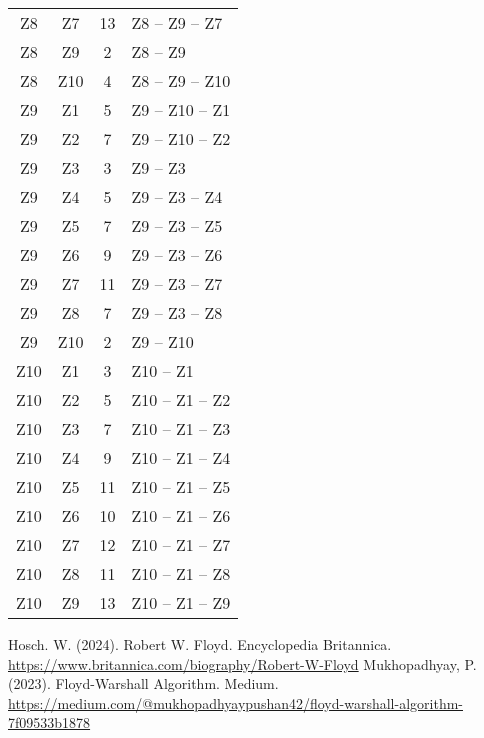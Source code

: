 \documentclass[a4paper,11pt]{article}
\begin{document}
\begin{longtable}{c c c p{7cm}}
Z8 & Z7 & 13 & Z8 -- Z9 -- Z7 \\
Z8 & Z9 & 2 & Z8 -- Z9 \\
Z8 & Z10 & 4 & Z8 -- Z9 -- Z10 \\
Z9 & Z1 & 5 & Z9 -- Z10 -- Z1 \\
Z9 & Z2 & 7 & Z9 -- Z10 -- Z2 \\
Z9 & Z3 & 3 & Z9 -- Z3 \\
Z9 & Z4 & 5 & Z9 -- Z3 -- Z4 \\
Z9 & Z5 & 7 & Z9 -- Z3 -- Z5 \\
Z9 & Z6 & 9 & Z9 -- Z3 -- Z6 \\
Z9 & Z7 & 11 & Z9 -- Z3 -- Z7 \\
Z9 & Z8 & 7 & Z9 -- Z3 -- Z8 \\
Z9 & Z10 & 2 & Z9 -- Z10 \\
Z10 & Z1 & 3 & Z10 -- Z1 \\
Z10 & Z2 & 5 & Z10 -- Z1 -- Z2 \\
Z10 & Z3 & 7 & Z10 -- Z1 -- Z3 \\
Z10 & Z4 & 9 & Z10 -- Z1 -- Z4 \\
Z10 & Z5 & 11 & Z10 -- Z1 -- Z5 \\
Z10 & Z6 & 10 & Z10 -- Z1 -- Z6 \\
Z10 & Z7 & 12 & Z10 -- Z1 -- Z7 \\
Z10 & Z8 & 11 & Z10 -- Z1 -- Z8 \\
Z10 & Z9 & 13 & Z10 -- Z1 -- Z9 \\
\hline
\end{longtable}
\renewcommand{\refname}{Referencias}
\begin{thebibliography}{9}
 Hosch. W. (2024). Robert W. Floyd. Encyclopedia Britannica. \\ \url{https://www.britannica.com/biography/Robert-W-Floyd}
 Mukhopadhyay, P. (2023). Floyd-Warshall Algorithm. Medium. \\ \url{https://medium.com/@mukhopadhyaypushan42/floyd-warshall-algorithm-7f09533b1878}
\end{thebibliography}
\end{document}
